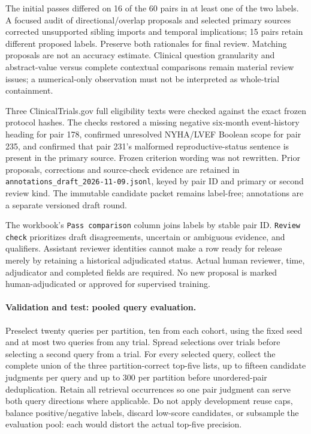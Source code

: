 \documentclass[10pt,letterpaper]{article}
\newcommand{\pathcode}[1]{\nolinkurl{#1}}
\begin{document}
The initial passes differed on 16 of the 60 pairs in at least one of the two
labels. A focused audit of directional/overlap proposals and selected primary
sources corrected unsupported sibling imports and temporal implications;
15 pairs retain different proposed labels. Preserve both rationales for final
review. Matching proposals are not an accuracy estimate. Clinical question
granularity and abstract-value versus complete contextual comparisons remain
material review issues; a numerical-only observation must not be interpreted
as whole-trial containment.

Three ClinicalTrials.gov full eligibility texts were checked against the exact
frozen protocol hashes. The checks restored a missing negative six-month
event-history heading for pair 178, confirmed unresolved NYHA/LVEF Boolean scope
for pair 235, and confirmed that pair 231's malformed reproductive-status
sentence is present in the primary source. Frozen criterion wording was not
rewritten. Prior proposals, corrections and source-check evidence are retained
in \pathcode{annotations_draft_2026-11-09.jsonl}, keyed by pair ID and primary
or second review kind. The immutable candidate packet remains label-free;
annotations are a separate versioned draft round.

The workbook's \texttt{Pass comparison} column joins labels by stable pair ID.
\texttt{Review check} prioritizes draft disagreements, uncertain or ambiguous
evidence, and qualifiers. Assistant reviewer identities cannot make a row
ready for release merely by retaining a historical adjudicated status. Actual
human reviewer, time, adjudicator and completed fields are required. No new
proposal is marked human-adjudicated or approved for supervised training.

\paragraph{Validation and test: pooled query evaluation.}
Preselect twenty queries per partition, ten from each cohort, using the fixed
seed and at most two queries from any trial. Spread selections over trials
before selecting a second query from a trial. For every selected query, collect
the complete union of the three partition-correct top-five lists, up to fifteen
candidate judgments per query and up to 300 per partition before unordered-pair
deduplication. Retain all retrieval occurrences so one pair judgment can serve
both query directions where applicable. Do not apply development reuse caps,
balance positive/negative labels, discard low-score candidates, or subsample
the evaluation pool: each would distort the actual top-five precision.
\end{document}
